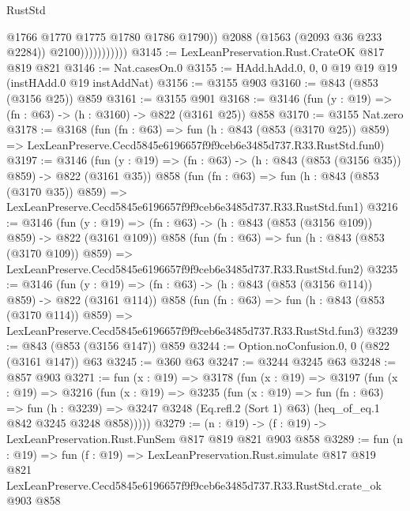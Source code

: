 \begin{lexlean}{RustStd}
\begin{coremodule}
                              @1766
                              @1770
                              @1775
                              @1780
                              @1786
                              @1790))
                          @2088
                          (@1563 (@2093 @36 @233 @2284))
                          @2100)))))))))))
@3145 := LexLeanPreservation.Rust.CrateOK @817 @819 @821
@3146 := Nat.casesOn.{0}
@3155 := HAdd.hAdd.{0, 0, 0} @19 @19 @19 (instHAdd.{0} @19 instAddNat)
@3156 := @3155 @903
@3160 := @843 (@853 (@3156 @25)) @859
@3161 := @3155 @901
@3168 := @3146 (fun (y : @19) => (fn : @63) -> (h : @3160) -> @822 (@3161 @25)) @858
@3170 := @3155 Nat.zero
@3178 := @3168
    (fun (fn : @63) =>
    fun (h : @843 (@853 (@3170 @25)) @859) =>
    LexLeanPreserve.Cecd5845e6196657f9f9ceb6e3485d737.R33.RustStd.fun0)
@3197 := @3146
    (fun (y : @19) => (fn : @63) -> (h : @843 (@853 (@3156 @35)) @859) -> @822 (@3161 @35))
    @858
    (fun (fn : @63) =>
    fun (h : @843 (@853 (@3170 @35)) @859) =>
    LexLeanPreserve.Cecd5845e6196657f9f9ceb6e3485d737.R33.RustStd.fun1)
@3216 := @3146
    (fun (y : @19) => (fn : @63) -> (h : @843 (@853 (@3156 @109)) @859) -> @822 (@3161 @109))
    @858
    (fun (fn : @63) =>
    fun (h : @843 (@853 (@3170 @109)) @859) =>
    LexLeanPreserve.Cecd5845e6196657f9f9ceb6e3485d737.R33.RustStd.fun2)
@3235 := @3146
    (fun (y : @19) => (fn : @63) -> (h : @843 (@853 (@3156 @114)) @859) -> @822 (@3161 @114))
    @858
    (fun (fn : @63) =>
    fun (h : @843 (@853 (@3170 @114)) @859) =>
    LexLeanPreserve.Cecd5845e6196657f9f9ceb6e3485d737.R33.RustStd.fun3)
@3239 := @843 (@853 (@3156 @147)) @859
@3244 := Option.noConfusion.{0, 0} (@822 (@3161 @147)) @63
@3245 := @360 @63
@3247 := @3244 @3245 @63
@3248 := @857 @903
@3271 := fun (x : @19) =>
  @3178
    (fun (x : @19) =>
    @3197
      (fun (x : @19) =>
      @3216
        (fun (x : @19) =>
        @3235
          (fun (x : @19) =>
          fun (fn : @63) =>
          fun (h : @3239) =>
          @3247 @3248 (Eq.refl.{2} (Sort 1) @63) (heq_of_eq.{1} @842 @3245 @3248 @858)))))
@3279 := (n : @19) -> (f : @19) -> LexLeanPreservation.Rust.FunSem @817 @819 @821 @903 @858
@3289 := fun (n : @19) =>
  fun (f : @19) =>
  LexLeanPreservation.Rust.simulate
    @817
    @819
    @821
    LexLeanPreserve.Cecd5845e6196657f9f9ceb6e3485d737.R33.RustStd.crate_ok
    @903
    @858
\end{coremodule}
\end{lexlean}
